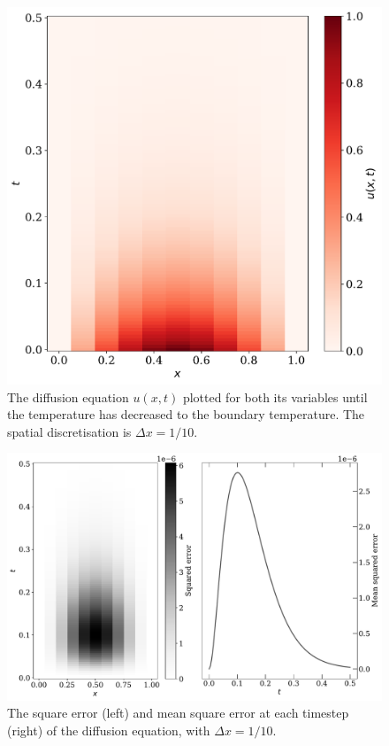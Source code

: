 \documentclass[a4paper, 
amsfonts, 
amssymb, 
amsmath, 
reprint, 
showkeys, 
nofootinbib, 
twoside]{revtex4-2}
\begin{document}
\begin{figure} [h!]
    \centering
    \includegraphics[width = \columnwidth]{Figures/num_u10.pdf}
    \caption{The diffusion equation $u(x, t)$ plotted for both its variables until the temperature has decreased to the boundary temperature. The spatial discretisation is $\Delta x = 1/10$. }
    \label{fig:u10}
\end{figure}

\begin{figure} [h!]
    \centering
    \includegraphics[width = \columnwidth]{Figures/num_err10.pdf}
    \caption{The square error (left) and mean square error at each timestep (right) of the diffusion equation, with $\Delta x = 1/10$. }
    \label{fig:err10}
\end{figure}
\end{document}
